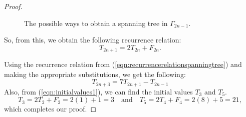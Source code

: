 \documentclass[10pt,a4paper]{amsart}
\begin{document}
\begin{proof}
\begin{figure}[htbp]
        \caption{The possible ways to obtain a spanning tree in $\Gamma_{2n - 1}$.}
        \label{fig:R_{2n - 1}}
    \end{figure}
    \par
    So, from this, we obtain the following recurrence relation: 
    \[ T_{2n + 1} = 2T_{2n} + F_{2n}.\]
    
    Using the recurrence relation from (\ref{eqn:recurrencerelationspanningtree}) and making the appropriate substitutions, we get the following: 
    \begin{equation} \label{eqn:recurrencerelationspanningtreeodd} 
     T_{2n+3} = 7T_{2n+1} - T_{2n-1}
 \end{equation}
    Also, from (\ref{eqn:initialvalues1}), we can find the initial values $T_3$ and $T_5$.
    \begin{equation}\label{eqn:initialvalues2}
    T_3 = 2T_2 + F_2 = 2(1) + 1 = 3
    \quad \text{and} \quad
    T_5 = 2T_4 + F_4 = 2(8) + 5 = 21,
\end{equation} which completes our proof.
\end{proof}
\end{document}
